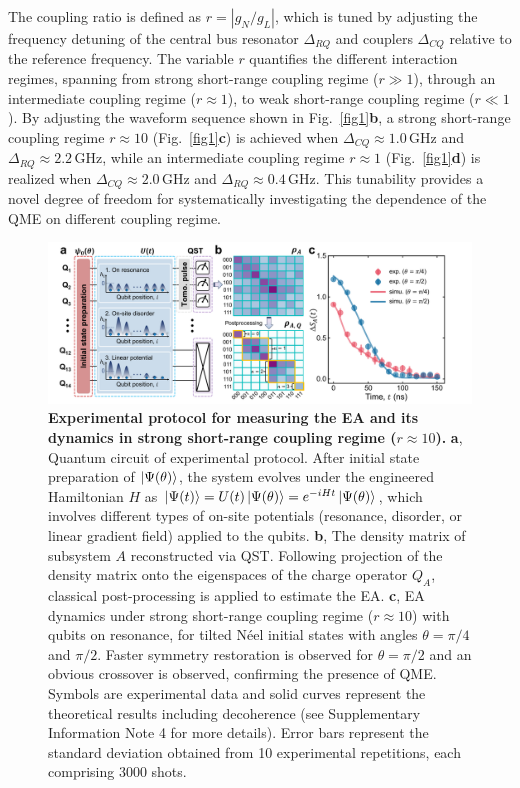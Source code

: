 \documentclass[reprint,superscriptaddress,preprintnumbers,longbibliography,
amsmath,amssymb,aps,floatfix,pra,twocolumn, tightenlines %
]{revtex4-2}
\begin{document}
The coupling ratio is defined as \( r = |g_N / g_L| \), which is tuned by adjusting the frequency detuning of the central bus resonator \( \Delta_{RQ} \) and couplers \( \Delta_{CQ} \) relative to the reference frequency. The variable \( r \) quantifies the different interaction regimes, spanning from strong short-range coupling regime (\( r \gg 1 \)), through an intermediate coupling regime (\( r \approx 1 \)), to weak short-range coupling regime (\( r \ll 1 \)). By adjusting the waveform sequence shown in Fig.~\ref{fig1}\textbf{b}, a strong short-range coupling regime \( r \approx 10 \) (Fig.~\ref{fig1}\textbf{c}) is achieved when \( \Delta_{CQ} \approx 1.0 \, \text{GHz} \) and \( \Delta_{RQ} \approx 2.2 \, \text{GHz} \), while an intermediate coupling regime \( r \approx 1 \) (Fig.~\ref{fig1}\textbf{d}) is realized when \( \Delta_{CQ} \approx 2.0 \, \text{GHz} \) and \( \Delta_{RQ} \approx 0.4 \, \text{GHz} \). This tunability provides a novel degree of freedom for systematically investigating the dependence of the QME on different coupling regime.
    
     \begin{figure}[t]
         \centering
     	\includegraphics[width=1.0\linewidth]{Figure2/Figure2.pdf}
     	\caption{\textbf{Experimental protocol for measuring the EA and its dynamics in strong short-range coupling regime ($ r \approx 10 $).} \textbf{a}, Quantum circuit of experimental protocol. After initial state preparation of $ \ket{\Psi(\theta)} $, the system evolves under the engineered Hamiltonian \( H \) as $\ket{\Psi(t)}= U(t) \ket{\Psi(\theta)}=e^{-iHt} \ket{\Psi(\theta)}$, which involves different types of on-site potentials (resonance, disorder, or linear gradient field) applied to the qubits. \textbf{b}, The density matrix of subsystem $A$ reconstructed via QST. Following projection of the density matrix onto the eigenspaces of the charge operator $ Q_A $, classical post-processing is applied to estimate the EA. \textbf{c}, EA dynamics under strong short-range coupling regime ($ r \approx 10 $) with qubits on resonance, for tilted Néel initial states with angles $\theta = \pi/4$ and $\pi/2$. Faster symmetry restoration is observed for $\theta = \pi/2$ and an obvious crossover is observed, confirming the presence of QME. Symbols are experimental data and solid curves represent the theoretical results including decoherence (see Supplementary Information Note 4 for more details). Error bars represent the standard deviation obtained from 10 experimental repetitions, each comprising 3000 shots.
     	}

	\label{fig2}
     \end{figure}
    
\end{document}
